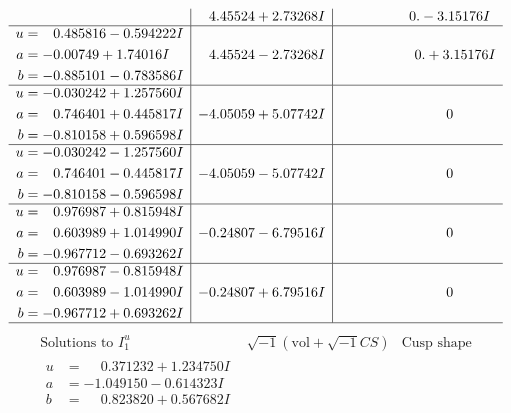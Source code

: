 \documentclass[1p]{elsarticle_modified}
\theoremstyle{definition}
\newcommand{\I}{\sqrt{-1}}
\begin{document}
$$\begin{array}{c|c|c}
 & \phantom{-}4.45524 + 2.73268 I & \phantom{-0.000000 } 0. - 3.15176 I \\ \hline\begin{aligned}
u &= \phantom{-}0.485816 - 0.594222 I \\
a &= -0.00749 + 1.74016 I \\
b &= -0.885101 - 0.783586 I\end{aligned}
 & \phantom{-}4.45524 - 2.73268 I & \phantom{-0.000000 -}0. + 3.15176 I \\ \hline\begin{aligned}
u &= -0.030242 + 1.257560 I \\
a &= \phantom{-}0.746401 + 0.445817 I \\
b &= -0.810158 + 0.596598 I\end{aligned}
 & -4.05059 + 5.07742 I & \phantom{-0.000000 } 0 \\ \hline\begin{aligned}
u &= -0.030242 - 1.257560 I \\
a &= \phantom{-}0.746401 - 0.445817 I \\
b &= -0.810158 - 0.596598 I\end{aligned}
 & -4.05059 - 5.07742 I & \phantom{-0.000000 } 0 \\ \hline\begin{aligned}
u &= \phantom{-}0.976987 + 0.815948 I \\
a &= \phantom{-}0.603989 + 1.014990 I \\
b &= -0.967712 - 0.693262 I\end{aligned}
 & -0.24807 - 6.79516 I & \phantom{-0.000000 } 0 \\ \hline\begin{aligned}
u &= \phantom{-}0.976987 - 0.815948 I \\
a &= \phantom{-}0.603989 - 1.014990 I \\
b &= -0.967712 + 0.693262 I\end{aligned}
 & -0.24807 + 6.79516 I & \phantom{-0.000000 } 0\\
 \hline 
 \end{array}$$\newpage$$\begin{array}{c|c|c}  
\text{Solutions to }I^u_{1}& \I (\text{vol} + \sqrt{-1}CS) & \text{Cusp shape}\\
 \hline 
\begin{aligned}
u &= \phantom{-}0.371232 + 1.234750 I \\
a &= -1.049150 - 0.614323 I \\
b &= \phantom{-}0.823820 + 0.567682 I\end{aligned}

\end{array}$$
\end{document}
